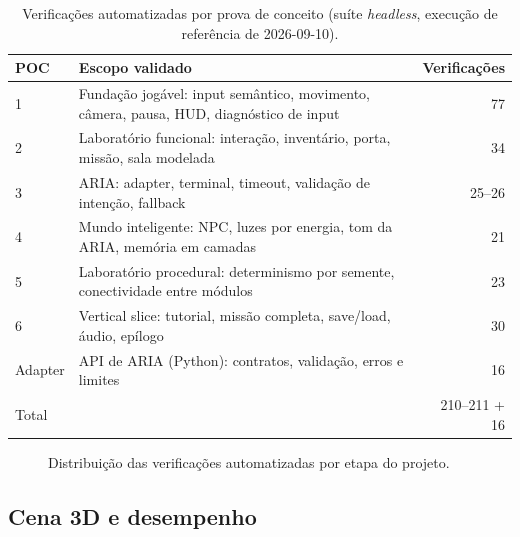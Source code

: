 \begin{table}[H]
\centering
\caption{Verificações automatizadas por prova de conceito (suíte \emph{headless}, execução de referência de 2026-09-10).}
\label{tab:verificacoes}
\begin{tabular}{@{}l >{\raggedright\arraybackslash}p{96mm} r@{}}
\toprule
POC & Escopo validado & Verificações \\
\midrule
1 & Fundação jogável: input semântico, movimento, câmera, pausa, HUD, diagnóstico de input & 77 \\
2 & Laboratório funcional: interação, inventário, porta, missão, sala modelada & 34 \\
3 & ARIA: adapter, terminal, timeout, validação de intenção, fallback & 25--26 \\
4 & Mundo inteligente: NPC, luzes por energia, tom da ARIA, memória em camadas & 21 \\
5 & Laboratório procedural: determinismo por semente, conectividade entre módulos & 23 \\
6 & Vertical slice: tutorial, missão completa, save/load, áudio, epílogo & 30 \\
Adapter & API de ARIA (Python): contratos, validação, erros e limites & 16 \\
\midrule
Total & & 210--211 + 16 \\
\bottomrule
\end{tabular}
\end{table}

\begin{figure}[H]
\centering
{}
\caption{Distribuição das verificações automatizadas por etapa do projeto.}
\label{fig:verificacoes}
\end{figure}

\subsection{Cena 3D e desempenho}

